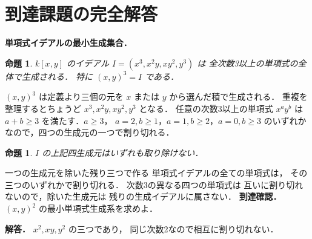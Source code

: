 \documentclass[a5paper,10pt,onecolumn]{jsarticle}
\makeatletter
\theoremstyle{mathnotetheorem}
\newtheorem{proposition}[theorem]{命題}
\renewcommand{\proofname}{証明}
\renewenvironment{proof}[1][\proofname]{%
  \par\pushQED{\qed}\normalfont\topsep4\p@\@plus2\p@\relax
  \trivlist\item[\hskip\labelsep\bfseries #1]\ignorespaces
}{\popQED\endtrivlist\@endpefalse}
\makeatother
\begin{document}
\section{到達課題の完全解答}
\noindent\textbf{単項式イデアルの最小生成集合．}
\begin{proposition}
$k[x,y]$ のイデアル
$I=(x^3,x^2y,xy^2,y^3)$ は
全次数3以上の単項式の全体で生成される．
特に $(x,y)^3=I$ である．
\end{proposition}
\begin{proof}
$(x,y)^3$ は定義より三個の元を
$x$ または $y$ から選んだ積で生成される．
重複を整理するとちょうど
$x^3,x^2y,xy^2,y^3$ となる．
任意の次数3以上の単項式 $x^ay^b$ は
$a+b\ge3$ を満たす．$a\ge3$，
$a=2,b\ge1$，$a=1,b\ge2$，$a=0,b\ge3$
のいずれかなので，四つの生成元の一つで割り切れる．
\end{proof}
\begin{proposition}
$I$ の上記四生成元はいずれも取り除けない．
\end{proposition}
\begin{proof}
一つの生成元を除いた残り三つで作る
単項式イデアルの全ての単項式は，
その三つのいずれかで割り切れる．
次数3の異なる四つの単項式は
互いに割り切れないので，除いた生成元は
残りの生成イデアルに属さない．
\end{proof}
\noindent\textbf{到達確認．}
$(x,y)^2$ の最小単項式生成系を求めよ．
\par\noindent\textbf{解答．}
$x^2,xy,y^2$ の三つであり，
同じ次数2なので相互に割り切れない．
\end{document}
